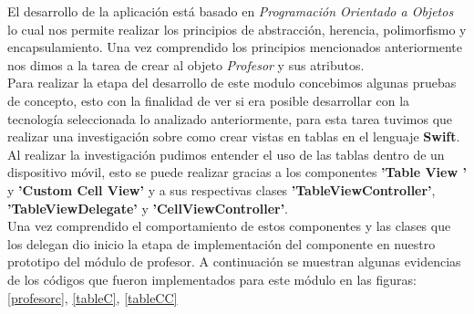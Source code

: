 	 El desarrollo de la aplicación está basado en \textit{Programación Orientado a Objetos} lo cual nos permite realizar los principios de abstracción, herencia, polimorfismo y encapsulamiento. Una vez comprendido los principios mencionados anteriormente nos dimos a la tarea de crear al objeto \textit{Profesor} y sus atributos. \\
	 
	  Para realizar la etapa del desarrollo de este modulo concebimos algunas pruebas de concepto, esto con la finalidad de ver si era posible desarrollar con la tecnología seleccionada  lo analizado anteriormente, para esta tarea tuvimos que realizar una investigación sobre como crear vistas en tablas en el lenguaje \textbf{Swift}.\\
	  
	  Al realizar la investigación pudimos entender el uso de las tablas dentro de un dispositivo móvil, esto se puede realizar gracias a los componentes \textbf{'Table View '} y \textbf{'Custom Cell View' } y  a sus respectivas clases \textbf{'TableViewController'}, \textbf{'TableViewDelegate'} y \textbf{ 'CellViewController'}. \\
	  
	  Una vez comprendido el comportamiento de estos componentes y las clases  que los delegan dio inicio la etapa de implementación del componente en nuestro prototipo del módulo de profesor. A continuación se muestran algunas evidencias de los códigos que fueron implementados para este módulo en las figuras: \ref{profesorc}, \ref{tableC}, \ref{tableCC}\\
	 
